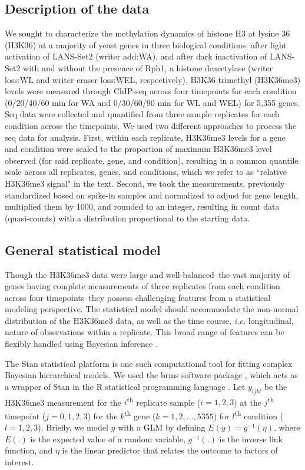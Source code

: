 \documentclass[11pt]{biorxiv}
\newcommand{\ie}{\emph{i.e.}\xspace}
\begin{document}
\subsection{Description of the data}
We sought to characterize the methylation dynamics of histone H3 at lysine 36 (H3K36) at a majority of yeast genes in three biological conditions: after light activation of LANS-Set2 (writer add:WA), and after dark inactivation of LANS-Set2 with and without the presence of Rph1, a histone deacetylase (writer loss:WL and writer eraser loss:WEL, respectively). H3K36 trimethyl (H3K36me3) levels were measured through ChIP-seq across four timepoints for each condition (0/20/40/60 min for WA and 0/30/60/90 min for WL and WEL) for 5,355 genes. Seq data were collected and quantified from three sample replicates for each condition across the timepoints. We used two different approaches to process the seq data for analysis. First, within each replicate, H3K36me3 levels for a gene and condition were scaled to the proportion of maximum H3K36me3 level observed (for said replicate, gene, and condition), resulting in a common quantile scale across all replicates, genes, and conditions, which we refer to as ``relative H3K36me3 signal" in the text. Second, we took the measurements, previously standardized based on spike-in samples and normalized to adjust for gene length, multiplied them by 1000, and rounded to an integer, resulting in count data (quasi-counts) with a distribution proportional to the starting data. 

\subsection{General statistical model}
Though the H3K36me3 data were large and well-balanced--the vast majority of genes having complete measurements of three replicates from each condition across four timepoints--they possess challenging features from a statistical modeling perspective. The statistical model should accommodate the non-normal distribution of the H3K36me3 data, as well as the time course, \ie longitudinal, nature of observations within a replicate. This broad range of features can be flexibly handled using Bayesian inference \citep{Gelman2006, Gelman2013}. 
	
The Stan statistical platform \citep{Carpenter2017} is one such computational tool for fitting complex Bayesian hierarchical models. We used the brms software package \citep{Burkner2017, Burkner2018}, which acts as a wrapper of Stan in the R statistical programming language \citep{RCoreTeam2019}. Let $y_{ijkl}$ be the H3K36me3 measurement for the $i$\textsuperscript{th} replicate sample ($i=1,2,3$) at the $j$\textsuperscript{th} timepoint ($j=0,1,2,3$) for the $k$\textsuperscript{th} gene ($k=1,2,…,5355$) for $l$\textsuperscript{th} condition ($l=1,2,3$). Briefly, we model $y$ with a GLM by defining $E(y)=g^{-1}(\eta)$, where $E(.)$ is the expected value of a random variable, $g^{-1}(.)$ is the inverse link function, and $\eta$ is the linear predictor that relates the outcome to factors of interest.
\end{document}
